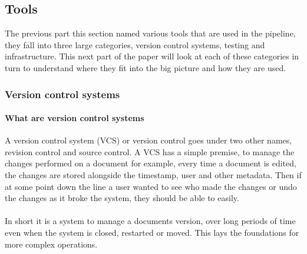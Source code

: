 \subsection{Tools}

The previous part this section named various tools that are used in the pipeline, they fall into three large categories, version control systems, testing  and infrastructure. This next part of the paper will look at each of these categories in turn to understand where they fit into the big picture and how they are used.

\subsubsection{Version control systems}

\paragraph{What are version control systems}
A version control system (VCS) or version control goes under two other names, revision control and source control. A VCS has a simple premise, to manage the changes performed on a document for example, every time a document is edited, the changes are stored alongside the timestamp, user and other metadata. Then if at some point down the line a user wanted to see who made the changes or undo the changes as it broke the system, they should be able to easily. 
\\\\
In short it is a system to manage a documents version, over long periods of time even when the system is closed, restarted or moved. This lays the foundations for more complex operations. 

